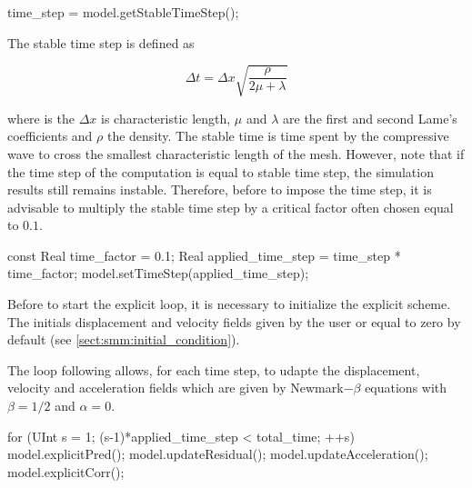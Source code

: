 \documentclass[a4paper,11pt]{book}
\begin{document}
\begin{cpp}
  time_step = model.getStableTimeStep();
\end{cpp}

The stable time step is defined as

\begin{equation}
  \Delta t = \Delta x \sqrt{\frac{\rho}{2 \mu +\lambda}}
\end{equation}
\label{eqn:smm:explicit:stabletime}

where is the $\Delta x$ is characteristic length, $\mu$ and $\lambda$ are the 
first and second Lame's coefficients and $\rho$ the density. The stable time is 
time spent by the compressive wave to cross the smallest characteristic length of 
the mesh. 
However, note that if the time step of the computation is equal to stable time step, 
the simulation results still remains instable. 
Therefore, before to impose the time step, it is advisable to multiply the stable 
time step by a critical factor often chosen equal to $0.1$.

\begin{cpp}
  const Real time_factor = 0.1;
  Real applied_time_step = time_step * time_factor;
  model.setTimeStep(applied_time_step);
\end{cpp}

Before to start the explicit loop, it is necessary to initialize the explicit scheme. 
The initials displacement and velocity fields given by the user or equal to zero by 
default (see \ref{sect:smm:initial_condition}).

The loop following allows, for each time step, to udapte the displacement, velocity 
and acceleration fields which are given by Newmark$-\beta$ equations with $\beta=1/2$ 
and $\alpha=0$.

\begin{cpp}
  for (UInt s = 1; (s-1)*applied_time_step < total_time; ++s) {
    model.explicitPred();
    model.updateResidual();
    model.updateAcceleration();
    model.explicitCorr();
  }
\end{cpp}
\end{document}
